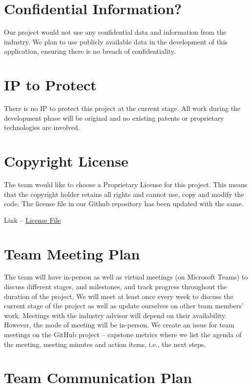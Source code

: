 \documentclass{article}
\begin{document}
\section{Confidential Information?}

Our project would not use any confidential data and information from the industry. We plan to use publicly available data in the development of this application, ensuring there is no breach of confidentiality.

\section{IP to Protect}

There is no IP to protect this project at the current stage. All work during the development phase will be original and no existing patents or proprietary technologies are involved. 

\section{Copyright License}

The team would like to choose a Proprietary License for this project. This means that the copyright holder retains all rights and cannot use, copy and modify the code. The license file in our Github repository has been updated with the same.

Link --  
\href{https://github.com/Inreet-Kaur/capstone/blob/main/LICENSE}{License File}


\section{Team Meeting Plan}

The team will have in-person as well as virtual meetings (on Microsoft Teams) to discuss different stages, and milestones, and track progress throughout the duration of the project. We will meet at least once every week to discuss the current stage of the project as well as update ourselves on other team members’ work. 
Meetings with the industry advisor will depend on their availability. However, the mode of meeting will be in-person. We create an issue for team meetings on the GitHub project – capstone metrics where we list the agenda of the meeting, meeting minutes and action items, i.e., the next steps.

\section{Team Communication Plan}
\end{document}
